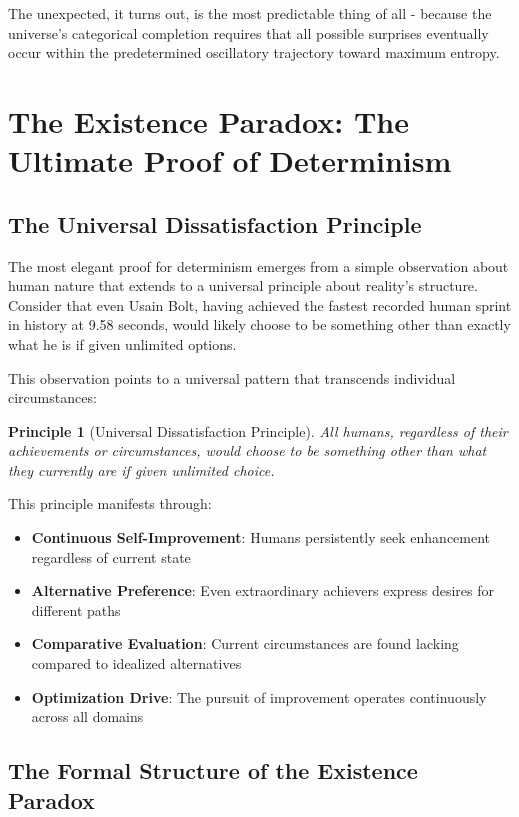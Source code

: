\documentclass[11pt]{article}
\newtheorem{principle}[theorem]{Principle}
\theoremstyle{remark}
\begin{document}
The unexpected, it turns out, is the most predictable thing of all - because the universe's categorical completion requires that all possible surprises eventually occur within the predetermined oscillatory trajectory toward maximum entropy.

\section{The Existence Paradox: The Ultimate Proof of Determinism}

\subsection{The Universal Dissatisfaction Principle}

The most elegant proof for determinism emerges from a simple observation about human nature that extends to a universal principle about reality's structure. Consider that even Usain Bolt, having achieved the fastest recorded human sprint in history at 9.58 seconds, would likely choose to be something other than exactly what he is if given unlimited options.

This observation points to a universal pattern that transcends individual circumstances:

\begin{principle}[Universal Dissatisfaction Principle]
All humans, regardless of their achievements or circumstances, would choose to be something other than what they currently are if given unlimited choice.
\end{principle}

This principle manifests through:
\begin{itemize}
\item \textbf{Continuous Self-Improvement}: Humans persistently seek enhancement regardless of current state
\item \textbf{Alternative Preference}: Even extraordinary achievers express desires for different paths
\item \textbf{Comparative Evaluation}: Current circumstances are found lacking compared to idealized alternatives
\item \textbf{Optimization Drive}: The pursuit of improvement operates continuously across all domains
\end{itemize}

\subsection{The Formal Structure of the Existence Paradox}
\end{document}
